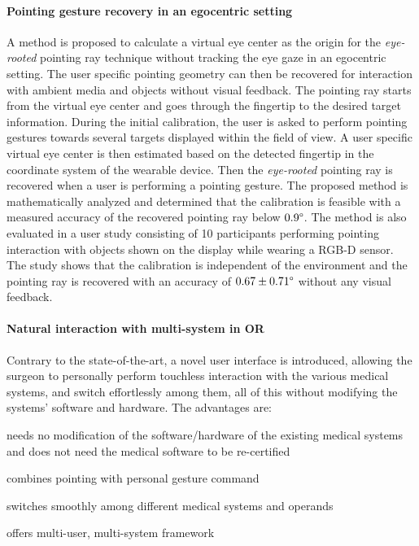 \paragraph{Pointing gesture recovery in an egocentric setting}  
A method is proposed to calculate a virtual eye center as the origin for the \textit{eye-rooted} pointing ray technique without tracking the eye gaze in an egocentric setting. The user specific pointing geometry can then be recovered for interaction with ambient media and objects without visual feedback. The pointing ray starts from the virtual eye center and goes through the fingertip to the desired target information. During the initial calibration, the user is asked to perform pointing gestures towards several targets displayed within the field of view. A user specific virtual eye center is then estimated based on the detected fingertip in the coordinate system of the wearable device. Then the \textit{eye-rooted} pointing ray is recovered when a user is performing a pointing gesture. 
The proposed method is mathematically analyzed and determined that the calibration is feasible with a measured accuracy of the recovered pointing ray below $0.9\degree$.
The method is also evaluated in a user study consisting of 10 participants performing pointing interaction with objects shown on the display while wearing a RGB-D sensor. The study shows that the calibration is independent of the environment and the pointing ray is recovered with an accuracy of $0.67 \pm 0.71\degree$ without any visual feedback.

\paragraph{Natural interaction with multi-system in OR}
Contrary to the state-of-the-art, a novel user interface is introduced, allowing the surgeon to {personally} perform touchless interaction with the {various} medical systems, and switch effortlessly among them, all of this {without modifying} the systems' software and hardware. The advantages are: 

\begin{description} [font=$\bullet$\scshape\bfseries]
	\item needs no modification of the software/hardware of the existing medical systems and does not need the medical software to be re-certified
	\item combines pointing with personal gesture command
	\item switches smoothly among different medical systems and operands
	\item offers multi-user, multi-system framework
\end{description}

